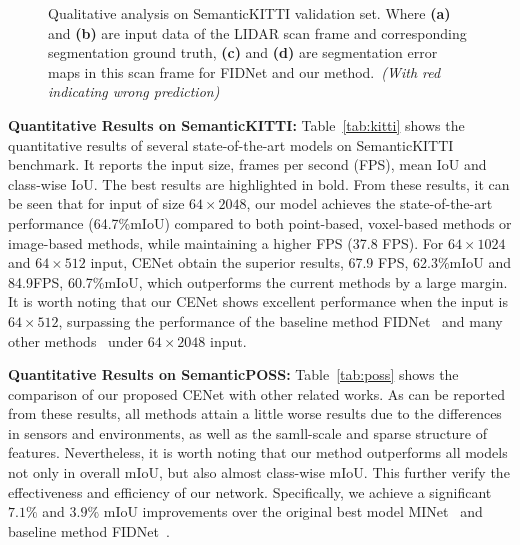 \documentclass{article}
\begin{document}
\begin{figure*}[ht]
	\vspace{-5mm}
	\centering
	 \hspace{1mm}
	 \hspace{1mm}
	 \hspace{1mm}
	 \hspace{1mm}
	\vspace{-3mm}
	\caption{Qualitative analysis on SemanticKITTI validation set. Where \textbf{(a)} and \textbf{(b)} are input data of the LIDAR scan frame and corresponding segmentation ground truth, \textbf{(c)} and \textbf{(d)} are segmentation error maps in this scan frame for FIDNet and our method.~\textit{(With red indicating wrong prediction)}}
	\label{fig:view}
\end{figure*}

\noindent\textbf{Quantitative Results on SemanticKITTI:} Table~\ref{tab:kitti} shows the quantitative results of several state-of-the-art models on SemanticKITTI benchmark. It reports the input size, frames per second (FPS), mean IoU and class-wise IoU. The best results are highlighted in bold. From these results, it can be seen that for input of size $64\times2048$, our model achieves the state-of-the-art performance (64.7\%mIoU) compared to both point-based, voxel-based methods or image-based methods, while maintaining a higher FPS (37.8 FPS). For $64\times1024$ and $64\times512$ input, CENet obtain the superior results, 67.9 FPS, 62.3\%mIoU and 84.9FPS, 60.7\%mIoU, which outperforms the current methods by a large margin. It is worth noting that our CENet shows excellent performance when the input is $64\times512$, surpassing the performance of the baseline method FIDNet~\cite{zhao2021fidnet} and many other methods~\cite{xu2020squeezesegv3, cortinhal2020salsanext, alnaggar2021multi} under $64\times2048$ input.


\noindent\textbf{Quantitative Results on SemanticPOSS:} Table~\ref{tab:poss} shows the comparison of our proposed CENet with other related works. As can be reported from these results, all methods attain  a little worse results due to the differences in sensors and environments, as well as the samll-scale and sparse structure of features. Nevertheless, it is worth noting that our method outperforms all models not only in overall mIoU, but also almost class-wise mIoU. This further verify the effectiveness and efficiency of our network. Specifically, we achieve a significant $7.1\%$ and $3.9\%$ mIoU improvements over the  original best model MINet~\cite{li2020multi} and baseline method FIDNet~\cite{zhao2021fidnet}.
\end{document}
